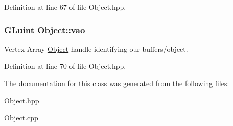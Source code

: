 Definition at line 67 of file Object.\-hpp.

\hypertarget{class_object_a66190fee29d03d6478516686cbd01eb8}{
\subsubsection[{vao}]{\setlength{\rightskip}{0pt plus 5cm}G\-Luint Object\-::vao\hspace{0.3cm}{\ttfamily [protected]}}}\label{class_object_a66190fee29d03d6478516686cbd01eb8}


Vertex Array \hyperlink{class_object}{Object} handle identifying our buffers/object. 



Definition at line 70 of file Object.\-hpp.



The documentation for this class was generated from the following files\-:\begin{DoxyCompactItemize}
\item 
Object.\-hpp\item 
Object.\-cpp\end{DoxyCompactItemize}
